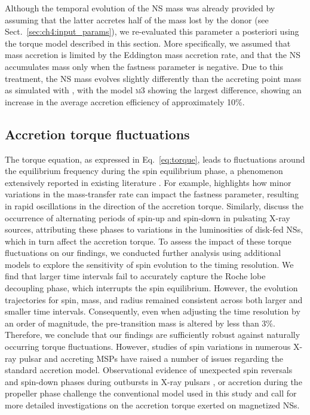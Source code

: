 \documentclass[main.tex]{subfiles}
\begin{document}
     Although the temporal evolution of the NS mass was already provided by \mesa assuming that the latter accretes half of the mass lost by the donor (see Sect.~\ref{sec:ch4:input_params}), we re-evaluated this parameter a posteriori using the torque model described in this section. More specifically, we assumed that mass accretion is limited by the Eddington mass accretion rate, and that the NS accumulates mass only when the fastness parameter is negative. 
     Due to this treatment, the NS mass evolves slightly differently than the accreting point mass as simulated with \mesa, with the model \textsc{m3} showing the largest difference, showing an increase in the average accretion efficiency of approximately 10\%. 
    
    
    \subsection{Accretion torque fluctuations} \label{sec:ch4:torque_fluctuations}
    The torque equation, as expressed in Eq.~\eqref{eq:torque}, leads to fluctuations around the equilibrium frequency during the spin equilibrium phase, a phenomenon extensively reported in existing literature \citep[e.g.,][]{1997ApJS..113..367B, 2023arXiv231113303D}. For example, \cite{Tauris:sc2012} highlights how minor variations in the mass-transfer rate can impact the fastness parameter, resulting in rapid oscillations in the direction of the accretion torque. Similarly, \cite{1980ApJ...241L.155E} discuss the occurrence of alternating periods of spin-up and spin-down in pulsating X-ray sources, attributing these phases to variations in the luminosities of disk-fed NSs, which in turn affect the accretion torque. 
    To assess the impact of these torque fluctuations on our findings, we conducted further analysis using additional \mesa models to explore the sensitivity of spin evolution to the timing resolution. We find that larger time intervals fail to accurately capture the Roche lobe decoupling phase, which interrupts the spin equilibrium. However, the evolution trajectories for spin, mass, and radius remained consistent across both larger and smaller time intervals. Consequently, even when adjusting the time resolution by an order of magnitude, the pre-transition mass is altered by less than 3\%. Therefore, we conclude that our findings are sufficiently robust against naturally occurring torque fluctuations.
    However, studies of spin variations in numerous X-ray pulsar and accreting MSPs have raised a number of issues regarding the standard accretion model. Observational evidence of unexpected spin reversals and spin-down phases during outbursts in X-ray pulsars \citep[e.g.,][]{1997ApJS..113..367B, 2002ApJ...576L.137G}, or accretion during the propeller phase challenge the conventional model used in this study and call for more detailed investigations on the accretion torque exerted on magnetized NSs.
    
\end{document}
